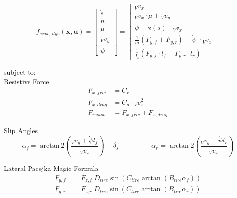\documentclass[
a4paper, %
10pt, %
notitlepage,
english]{CSUniSchoolLabReport}
\begin{document}
\begin{equation}
	f_{expl,\;dyn}(\mathbf{x}, \mathbf{u}) =
	\left[\begin{array}{c}
		
		\dot{s} \\ 
		
		\dot{n} \\ 
		
		\dot{\mu} \\
		
		{}_V\dot{v}_y \\
		
		\ddot{\psi}\;\;\;
		
	\end{array}\right] =
	\left[\begin{array}{c}
		
		{}_V v_x\\
		
		{}_V v_x \cdot \mu + {}_V v_y \\
		
		\dot{\psi} - \kappa(s)\;\cdot {}_V v_x  \\
		
		\frac{1}{m}  \left( F_{y, f} + F_{y, r} \right) - \dot{\psi}\;\cdot {}_V v_x \\
		
		\frac{1}{I_z}  \left(  F_{y, f} \cdot l_f - F_{y, r} \cdot l_r \right)
	\end{array}\right]
\end{equation}

subject to:\\

Resistive Force
\begin{align}
	F_{x, fric} &= C_r \\
	F_{x, drag} &= C_{d} \cdot {}_V v^2_x \\
	F_{resist} &= F_{x, fric} + F_{x, drag}
\end{align}
	
Slip Angles
\begin{equation}
	\alpha_f = \arctan2\left(\frac{{}_Vv_y + \dot{\psi} l_f}{{}_Vv_x}\right) - \delta_s
	\hspace{2cm}
	\alpha_r = \arctan2\left(\frac{{}_Vv_y - \dot{\psi} l_r}{{}_Vv_x}\right) 
\end{equation}

Lateral Pacejka Magic Formula
\begin{align}
	F_{y, f} &= F_{z, f} \; D_{tire} \sin\left(C_{tire} \arctan(B_{tire}\alpha_f)\right) \\
	F_{y, r} &= F_{z, r} \; D_{tire} \sin\left(C_{tire} \arctan(B_{tire}\alpha_r)\right)
\end{align}
\end{document}

